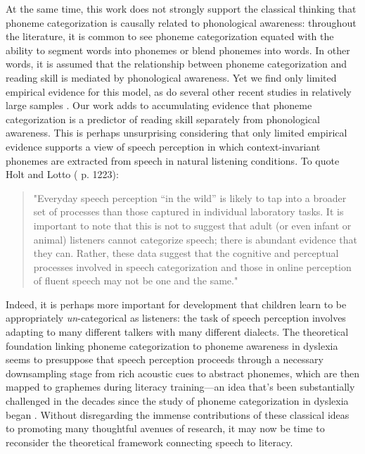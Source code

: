 \documentclass[../uwthesis.tex]{subfiles}
\begin{document}
At the same time, this work does not strongly support the classical thinking that phoneme categorization is causally related to phonological awareness: throughout the literature, it is common to see phoneme categorization equated with the ability to segment words into phonemes or blend phonemes into words. In other words, it is assumed that the relationship between phoneme categorization and reading skill is mediated by phonological awareness. Yet we find only limited empirical evidence for this model, as do several other recent studies in relatively large samples \citep{Robertson2009,Hakvoort2016,Snowling2019LongitudinalDyslexia}. Our work adds to accumulating evidence that phoneme categorization is a predictor of reading skill separately from phonological awareness. This is perhaps unsurprising considering that only limited empirical evidence supports a view of speech perception in which context-invariant phonemes are extracted from speech in natural listening conditions. To quote Holt and Lotto (\citep{Holt2010SpeechCategorization} p. 1223):
\begin{quote}
    "Everyday speech perception “in the wild” is likely to tap into a broader set of processes than those captured in individual laboratory tasks. It is important to note that this is not to suggest that adult (or even infant or animal) listeners cannot categorize speech; there is abundant evidence that they can. Rather, these data suggest that the cognitive and perceptual processes involved in speech categorization and those in online perception of fluent speech may not be one and the same."
\end{quote}

Indeed, it is perhaps more important for development that children learn to be appropriately \emph{un}-categorical as listeners: the task of speech perception involves adapting to many different talkers with many different dialects. The theoretical foundation linking phoneme categorization to phoneme awareness in dyslexia seems to presuppose that speech perception proceeds through a necessary downsampling stage from rich acoustic cues to abstract phonemes, which are then mapped to graphemes during literacy training---an idea that's been substantially challenged in the decades since the study of phoneme categorization in dyslexia began \citep{Cleary2001,Port2005,Port2007,McMurray2009,Toscano2010}. Without disregarding the immense contributions of these classical ideas to promoting many thoughtful avenues of research, it may now be time to reconsider the theoretical framework connecting speech to literacy. 
\end{document}
